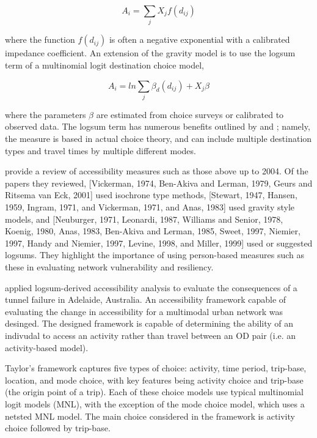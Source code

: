\begin{equation}
A_i = \sum_{j} X_j f(d_{ij})
  \label{eqn::gravity}
\end{equation}

where the function $f(d_{ij})$ is often a negative exponential with a
calibrated
impedance coefficient. An extension of the gravity model is to use the
logsum
term of a multinomial logit destination choice model,

\begin{equation}
A_i = ln\sum_{j} \beta_d(d_{ij}) + X_j\beta
  \label{eqn:logsum}
\end{equation}

where the parameters $\beta$ are estimated from choice surveys or
calibrated to
observed data. The logsum term has numerous benefits outlined by
\cite{handy1997}
and \cite{geurs2004}; namely, the measure is based in actual choice
theory, and
can include multiple destination types and travel times by multiple
different modes.

\cite{geurs2004} provide a review of accessibility measures such as those
above up to
2004. Of the papers they reviewed, [Vickerman, 1974, Ben-Akiva and Lerman,
1979, Geurs and
Ritsema van Eck, 2001] used isochrone type methods, [Stewart, 1947,
Hansen, 1959, Ingram, 1971,
and Vickerman, 1971, and Anas, 1983] used gravity style models, and
[Neuburger, 1971, Leonardi, 1987,
Williams and Senior, 1978, Koenig, 1980, Anas, 1983, Ben-Akiva and Lerman,
1985, Sweet,
1997, Niemier, 1997, Handy and Niemier, 1997, Levine, 1998, and Miller,
1999] used or
suggested logsums. They highlight the importance of using person-based
measures such as these in
evaluating network vulnerability and resiliency.

\cite{taylor2008} applied logsum-derived accessibility analysis to
evaluate the consequences of a tunnel failure in Adelaide, Australia. An
accessibility framework capable of evaluating the change in accessibility
for a multimodal urban network was desinged. The designed framework is
capable of determining the ability of an indivudal to access an activity
rather than travel between an OD pair (i.e. an activity-based model).

Taylor's framework captures five types of choice: activity, time period,
trip-base, location, and mode choice, with key features being activity
choice and trip-base (the origin point of a trip). Each of these choice
models use typical multinomial logit models (MNL), with the exception of
the mode choice model, which uses a netsted MNL model. The main choice
considered in the framework is activity choice followed by trip-base.

